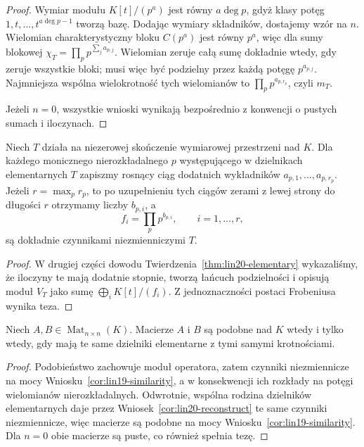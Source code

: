 \begin{proof}
Wymiar modułu \(K[t]/(p^a)\)
jest równy \(a\deg p\),
gdyż klasy potęg \(1,t,\ldots,t^{a\deg p-1}\)
tworzą bazę.
Dodając wymiary składników,
dostajemy wzór na \(n\).
Wielomian charakterystyczny
bloku \(C(p^a)\) jest równy \(p^a\),
więc dla sumy blokowej
\(\chi_T=\prod_p p^{\sum_j a_{p,j}}\).
Wielomian zeruje całą sumę
dokładnie wtedy, gdy zeruje wszystkie bloki;
musi więc być podzielny przez
każdą potęgę \(p^{a_{p,j}}\).
Najmniejsza wspólna wielokrotność
tych wielomianów to
\(\prod_p p^{a_{p,r_p}}\),
czyli \(m_T\).

Jeżeli \(n=0\), wszystkie
wnioski wynikają bezpośrednio
z konwencji o pustych sumach i iloczynach.
\end{proof}

\begin{wniosek}
\label{cor:lin20-reconstruct}
Niech \(T\) działa na niezerowej
skończenie wymiarowej przestrzeni nad \(K\).
Dla każdego monicznego
nierozkładalnego \(p\) występującego
w dzielnikach elementarnych \(T\)
zapiszmy rosnący ciąg dodatnich
wykładników \(a_{p,1},\ldots,a_{p,r_p}\).
Jeżeli \(r=\max_p r_p\),
to po uzupełnieniu tych ciągów
zerami z lewej strony do długości \(r\)
otrzymamy liczby \(b_{p,i}\), a
\[
 f_i=\prod_p p^{b_{p,i}},
 \qquad i=1,\ldots,r,
\]
są dokładnie czynnikami niezmienniczymi \(T\).
\end{wniosek}
\begin{proof}
W drugiej części dowodu
Twierdzenia~\ref{thm:lin20-elementary}
wykazaliśmy, że iloczyny te
mają dodatnie stopnie,
tworzą łańcuch podzielności
i opisują moduł \(V_T\) jako
sumę \(\bigoplus_i K[t]/(f_i)\).
Z jednoznaczności postaci Frobeniusa
wynika teza.
\end{proof}

\begin{wniosek}
\label{cor:lin20-similarity}
Niech \(A,B\in\operatorname{Mat}_{n\times n}(K)\).
Macierze \(A\) i \(B\) są podobne nad \(K\)
wtedy i tylko wtedy, gdy mają
te same dzielniki elementarne
z tymi samymi krotnościami.
\end{wniosek}
\begin{proof}
Podobieństwo zachowuje moduł operatora,
zatem czynniki niezmiennicze
na mocy Wniosku~\ref{cor:lin19-similarity},
a w konsekwencji ich rozkłady
na potęgi wielomianów nierozkładalnych.
Odwrotnie, wspólna rodzina dzielników
elementarnych daje przez
Wniosek~\ref{cor:lin20-reconstruct}
te same czynniki niezmiennicze,
więc macierze są podobne na mocy
Wniosku~\ref{cor:lin19-similarity}.
Dla \(n=0\) obie macierze są puste,
co również spełnia tezę.
\end{proof}

